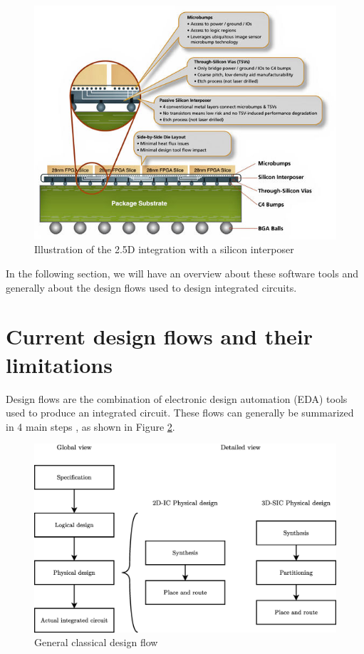 \begin{figure}[h!]
\begin{center}
\includegraphics[width=0.8\linewidth]{siliconinterposer}
\end{center}
\caption{Illustration of the 2.5D integration with a silicon interposer \cite{bolsens2011}}
\label{fig:siliconinterposer}
\end{figure}

In the following section, we will have an overview about these software tools and generally about the design flows used to design integrated circuits.

\section{Current design flows and their limitations}

Design flows are the combination of electronic design automation (EDA) tools used to produce an integrated circuit. These flows can generally be summarized in 4 main steps \cite{coursefred}, as shown in Figure \ref{fig:designflow}.

\begin{figure}[h!]
\begin{center}
\includegraphics[width=\linewidth]{designflow2.eps}
\end{center}
\vspace{-0.5cm}
\caption{General classical design flow}
\label{fig:designflow}
\end{figure}

